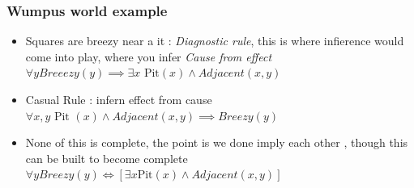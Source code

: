 \documentclass{article}
\theoremstyle{mytheoremstyle}
\theoremstyle{mytheoremstyle}
\theoremstyle{myproblemstyle}
\begin{document}
\subsubsection{Wumpus world example }
\begin{itemize}
	\item Squares are breezy near a it : \textit{Diagnostic rule}, this is where infierence would come into play, where you infer \textit{Cause from effect}
	      \begin{math}
		      \forall y Breeezy(y) \implies  \exists x \text{ Pit}(x) \land Adjacent(x,y)

	      \end{math}
	\item Casual Rule : infern effect from cause
	      \begin{math}
		      \forall x, y \text{ Pit }(x) \land Adjacent(x,y) \implies Breezy(y)
	      \end{math}
	\item None of this is complete, the point is we done imply each other , though this can be built to become complete
	      \begin{math}
		      \forall y Breezy(y) \iff[\exists x \text{Pit}(x) \land  Adjacent(x,y)]
	      \end{math}



\end{itemize}
\end{document}
